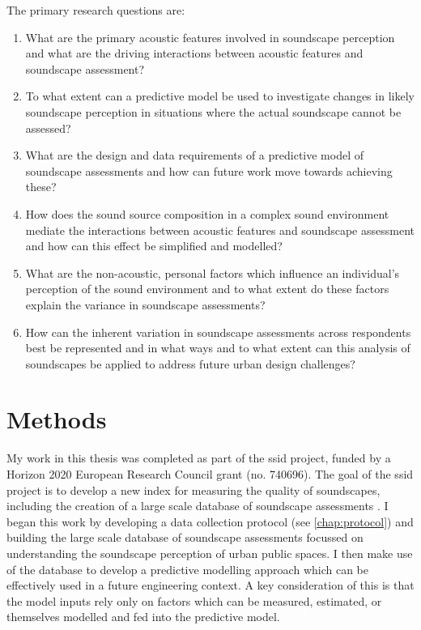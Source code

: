 The primary research questions are:

\begin{enumerate}
  \item What are the primary acoustic features involved in soundscape perception and what are the driving interactions between acoustic features and soundscape assessment?
  \item To what extent can a predictive model be used to investigate changes in likely soundscape perception in situations where the actual soundscape cannot be assessed?
  \item What are the design and data requirements of a predictive model of soundscape assessments and how can future work move towards achieving these?
  \item How does the sound source composition in a complex sound environment mediate the interactions between acoustic features and soundscape assessment and how can this effect be simplified and modelled?
  \item What are the non-acoustic, personal factors which influence an individual's perception of the sound environment and to what extent do these factors explain the variance in soundscape assessments? 
  \item How can the inherent variation in soundscape assessments across respondents best be represented and in what ways and to what extent can this analysis of soundscapes be applied to address future urban design challenges? 
\end{enumerate}

\section{Methods}

My work in this thesis was completed as part of the \gls{ssid} project, funded by a Horizon 2020 European Research Council grant (no. 740696). The goal of the \gls{ssid} project is to develop a new index for measuring the quality of soundscapes, including the creation of a large scale database of soundscape assessments \citep{Kang2019Towards}. I began this work by developing a data collection protocol (see \cref{chap:protocol}) and building the large scale database of soundscape assessments focussed on understanding the soundscape perception of urban public spaces. I then make use of the database to develop a predictive modelling approach which can be effectively used in a future engineering context. A key consideration of this is that the model inputs rely only on factors which can be measured, estimated, or themselves modelled and fed into the predictive model. 

